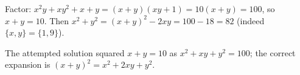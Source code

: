 Factor: $x^2y+xy^2+x+y=(x+y)(xy+1)=10(x+y)=100$, so $x+y=10$. Then $x^2+y^2=(x+y)^2-2xy=100-18=\boxed{82}$ (indeed $\{x,y\}=\{1,9\}$).

The attempted solution squared $x+y=10$ as $x^2+xy+y^2=100$; the correct expansion is $(x+y)^2=x^2+2xy+y^2$.
